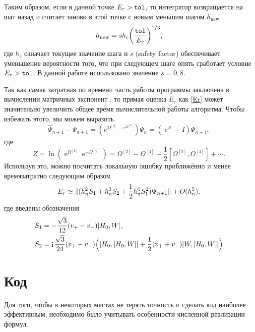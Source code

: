 \documentclass[12pt]{article}
\DeclareMathOperator{\Exp}{e}
\DeclareMathOperator\Iunit{i}
\DeclarePairedDelimiter{\norm}{\lVert}{\rVert}
\renewcommand\exp\Exp
\renewcommand\imath\Iunit
\begin{document}
Таким образом, если в данной точке $E_r>\text{\texttt{tol}}$, то интегратор
возвращается на шаг назад и считает заново в этой точке с новым меньшим шагом
$h_{\text{new}}$
\begin{equation}
  h_{\text{new}}=sh_c\biggl(\frac{\text{\texttt{tol}}}{E_r}\biggr)^{1/3},
\end{equation}
где $h_c$ означает текущее значение шага и $s$ (safety factor) обеспечивает
уменьшение вероятности того, что при следующем шаге опять сработает условие
$E_r>\text{\texttt{tol}}$. В данной работе использовано значение $s=0{,}8$.

Так как самая затратная по времени часть работы программы заключена в вычислении
матричных экспонент%
, то прямая оценка $E_r$ как \eqref{Er} может значительно
увеличить общее время вычислительной работы алгоритма. Чтобы избежать этого, мы
можем выразить
\begin{equation}
  \hat\Psi_{n+1}-\Psi_{n+1}=(e^{\Omega^{[2]}-e^{\Omega^{[4]}}})\Psi_n=(\exp^Z-I)\Psi_{n+1},
\end{equation}
где 
\begin{equation}\label{Z}
  Z=\ln(\exp^{\Omega^{[2]}}\exp^{-\Omega^{[4]}})=\Omega^{[2]} - \Omega^{[4]} -
  \frac{1}{2}[\Omega^{[2]},\Omega^{[4]}]+\cdots .
\end{equation}
Используя это, можно посчитать локальную ошибку приближённо и менее
времязатратно следующим образом
\begin{equation}
  E_r\simeq\norm{(h^2_n S_1+h^3_n S_2 + \frac{1}{2}h^4_n S^2_1)\Psi_{n+1}} +
  O(h^5_n),
\end{equation}
где введены обозначения
\begin{align}
  S_1&=-\frac{\sqrt{3}}{12}(v_+-v_-)[H_0,W],\\
  S_2&=\imath\frac{\sqrt{3}}{24}(v_+-v_-)\Bigl([H_0,[H_0,W]]+\frac{1}{2}(v_++v_-)[W,[H_0,W]]\Bigr)
\end{align}

\section{Код} %

Для того, чтобы в некоторых местах не терять точность и сделать код наиболее
эффективным, необходимо было учитывать особенности численной реализации формул.
\end{document}
